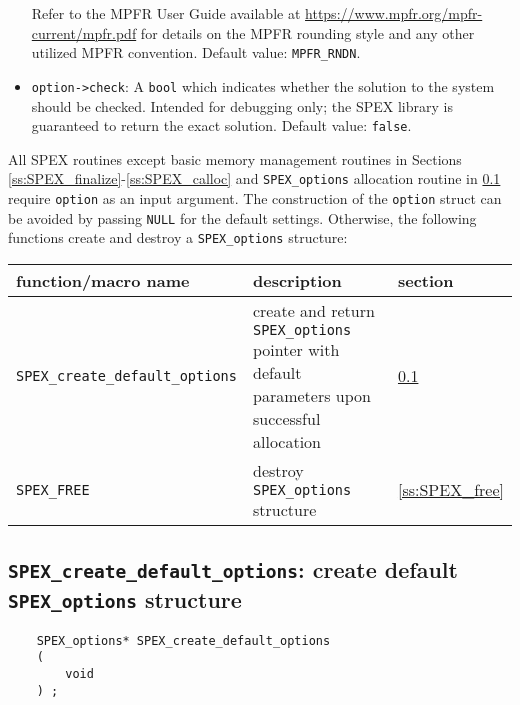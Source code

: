 \documentclass[12pt]{report}
\theoremstyle{definition}
\begin{document}
\begin{itemize}
\noindent Refer to the MPFR User Guide available at
\url{https://www.mpfr.org/mpfr-current/mpfr.pdf} for details on the MPFR
rounding style and any other utilized MPFR convention. Default value:
\verb|MPFR_RNDN|.

\item
\verb|option->check|: A \verb|bool| which indicates whether the solution to the
system should be checked. Intended for debugging only; the SPEX library is
guaranteed to return the exact solution. Default value: \verb|false|.

\end{itemize}

All SPEX routines except basic memory management routines in Sections
\ref{ss:SPEX_finalize}-\ref{ss:SPEX_calloc} and \verb|SPEX_options| allocation
routine in \ref{ss:create_default_options} require \verb|option| as an input
argument.  The construction of the \verb|option| struct can be avoided by
passing \verb|NULL| for the default settings.  Otherwise, the following
functions create and destroy a \verb|SPEX_options| structure:

\begin{center}
\begin{tabular}{lp{2.5in}l}
\hline
function/macro name & description & section \\
\hline
\verb|SPEX_create_default_options|
    & create and return \verb|SPEX_options| pointer
      with default parameters upon successful allocation
    & \ref{ss:create_default_options} \\
\hline
\verb|SPEX_FREE|
    & destroy \verb|SPEX_options| structure
    & \ref{ss:SPEX_free} \\
\hline
\end{tabular}
\end{center}

\cprotect\subsection{\verb|SPEX_create_default_options|: create default \verb|SPEX_options| structure}
\label{ss:create_default_options}

\begin{mdframed}[userdefinedwidth=6in]
{\footnotesize
\begin{verbatim}
    SPEX_options* SPEX_create_default_options
    (
        void
    ) ;
\end{verbatim}
} \end{mdframed}
\end{document}
